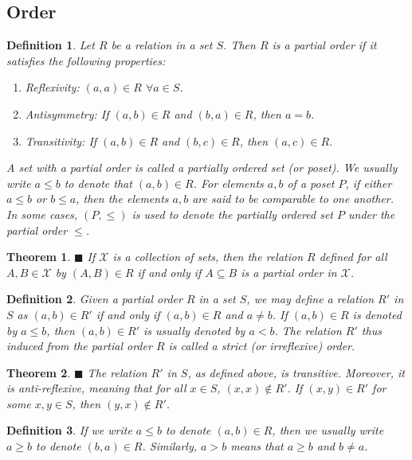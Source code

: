 \documentclass[a4paper]{article}
\newtheorem{mytheorem}{Theorem}
\newtheorem{mydef}{Definition}
\numberwithin{mytheorem}{section}
\numberwithin{mydef}{section}
\numberwithin{axiom}{section}
\numberwithin{example}{section}
\newcommand{\done}{$\blacksquare$ }
\begin{document}
\subsection{Order}

\begin{mydef}Let $R$ be a relation in a set $S$. Then $R$ is a partial order if it satisfies the following properties:
 \begin{enumerate}
 \item Reflexivity: $(a,a) \in R$ $\forall a \in S$. 
 \item Antisymmetry: If $(a,b) \in R$ and $(b,a) \in R$, then $a = b$. 
 \item Transitivity: If $(a,b) \in R$ and $(b,c) \in R$, then $(a,c) \in R$.
 \end{enumerate}
 A set with a partial order is called a partially ordered set (or poset). We usually write $a \leq b$ to denote that $(a,b) \in R$. For elements $a,b$ of a poset $P$, if either $a \leq b$ or $b \leq a$, then the elements $a,b$ are said to be comparable to one another. In some cases, $(P, \leq)$ is used to denote the partially ordered set $P$ under the partial order $\leq$.
\end{mydef}

\begin{mytheorem} \done If $\mathcal{X}$ is a collection of sets, then the relation $R$ defined for all $A,B \in \mathcal{X}$ by $(A,B) \in R$ if and only if $A \subseteq B$ is a partial order in $\mathcal{X}$.
\end{mytheorem}

\begin{mydef} Given a partial order $R$ in a set $S$, we may define a relation $R'$ in $S$ as $(a,b) \in R'$ if and only if $(a,b) \in R$ and $a \neq b$. If $(a,b) \in R$ is denoted by $a \leq b$, then $(a,b) \in R'$ is usually denoted by $a < b$. The relation $R'$ thus induced from the partial order $R$ is called a strict (or irreflexive) order.
\end{mydef}

\begin{mytheorem} \done The relation $R'$ in $S$, as defined above, is transitive. Moreover, it is anti-reflexive, meaning that for all $x \in S$, $(x,x) \notin R'$. If $(x,y) \in R'$ for some $x,y \in S$, then $(y,x) \notin R'$.
\end{mytheorem}

\begin{mydef} If we write $a \leq b$ to denote $(a,b) \in R$, then we usually write $a \geq b$ to denote $(b,a) \in R$. Similarly, $a > b$ means that $a \geq b$ and $b \neq a$. 
\end{mydef}
\end{document}
